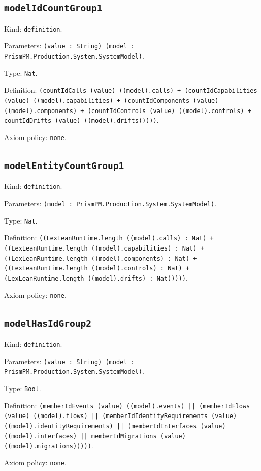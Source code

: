 \documentclass[11pt]{article}
\begin{document}
\subsection*{\texttt{modelIdCountGroup1}}
\noindent Kind: \texttt{definition}.\par
\noindent Parameters: \texttt{(value : String) (model : PrismPM.Production.System.SystemModel)}.\par
\noindent Type: \texttt{Nat}.\par
\noindent Definition: \texttt{(countIdCalls (value) ((model).calls) + (countIdCapabilities (value) ((model).capabilities) + (countIdComponents (value) ((model).components) + (countIdControls (value) ((model).controls) + countIdDrifts (value) ((model).drifts)))))}.\par
\noindent Axiom policy: \texttt{none}.\par
\subsection*{\texttt{modelEntityCountGroup1}}
\noindent Kind: \texttt{definition}.\par
\noindent Parameters: \texttt{(model : PrismPM.Production.System.SystemModel)}.\par
\noindent Type: \texttt{Nat}.\par
\noindent Definition: \texttt{((LexLeanRuntime.length ((model).calls) : Nat) + ((LexLeanRuntime.length ((model).capabilities) : Nat) + ((LexLeanRuntime.length ((model).components) : Nat) + ((LexLeanRuntime.length ((model).controls) : Nat) + (LexLeanRuntime.length ((model).drifts) : Nat)))))}.\par
\noindent Axiom policy: \texttt{none}.\par
\subsection*{\texttt{modelHasIdGroup2}}
\noindent Kind: \texttt{definition}.\par
\noindent Parameters: \texttt{(value : String) (model : PrismPM.Production.System.SystemModel)}.\par
\noindent Type: \texttt{Bool}.\par
\noindent Definition: \texttt{(memberIdEvents (value) ((model).events) || (memberIdFlows (value) ((model).flows) || (memberIdIdentityRequirements (value) ((model).identityRequirements) || (memberIdInterfaces (value) ((model).interfaces) || memberIdMigrations (value) ((model).migrations)))))}.\par
\noindent Axiom policy: \texttt{none}.\par
\end{document}
